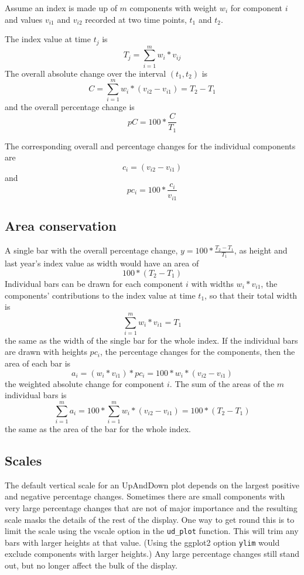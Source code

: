 Assume an index is made up of \(m\) components with weight \(w_i\) for component \(i\) and values \(v_{i1}\) and \(v_{i2}\) recorded at two time points, \(t_1\) and \(t_2\).

The index value at time \(t_j\) is
\[T_j=\sum_{i=1}^{m}w_i*v_{ij}\]
The overall absolute change over the interval \((t_1, t_2)\) is
\[C=\sum_{i=1}^{m}w_i*(v_{i2}-v_{i1})=T_2-T_1\]
and the overall percentage change is
\[pC=100*\frac{C}{T_1}\]

The corresponding overall and percentage changes for the individual components are
\[c_i=(v_{i2}-v_{i1})\]
and
\[pc_i=100*\frac{c_i}{v_{i1}}\]

\hypertarget{area-conservation}{%
\subsection{Area conservation}\label{area-conservation}}

A single bar with the overall percentage change, \(y=100*\frac{T_2-T_1}{T_1}\), as height and last year's index value as width would have an area of \[100*(T_2-T_1)\]
Individual bars can be drawn for each component \(i\) with widths \(w_i*v_{i1}\), the components' contributions to the index value at time \(t_1\), so that their total width is
\[\sum_{i=1}^{m}w_i*v_{i1}=T_1\]
the same as the width of the single bar for the whole index. If the individual bars are drawn with heights \(pc_i\), the percentage changes for the components, then the area of each bar is
\[a_i=(w_i*v_{i1})*pc_i=100*w_i*(v_{i2}-v_{i1})\]
the weighted absolute change for component \(i\). The sum of the areas of the \(m\) individual bars is
\[\sum_{i=1}^{m}a_i=100*\sum_{i=1}^{m}w_i*(v_{i2}-v_{i1})=100*(T_2-T_1)\]
the same as the area of the bar for the whole index.

\hypertarget{scales}{%
\subsection{Scales}\label{scales}}

The default vertical scale for an UpAndDown plot depends on the largest positive and negative percentage changes. Sometimes there are small components with very large percentage changes that are not of major importance and the resulting scale masks the details of the rest of the display. One way to get round this is to limit the scale using the vscale option in the \texttt{ud\_plot} function. This will trim any bars with larger heights at that value. (Using the ggplot2 option \texttt{ylim} would exclude components with larger heights.) Any large percentage changes still stand out, but no longer affect the bulk of the display.

